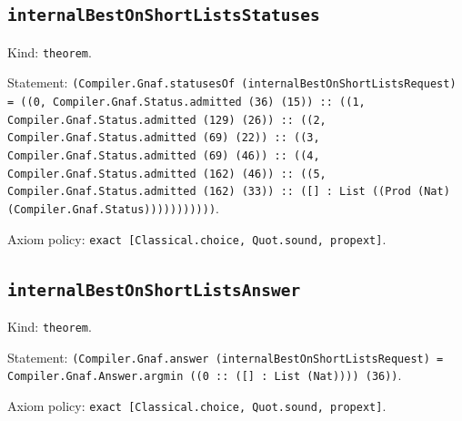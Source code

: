 \documentclass[11pt]{article}
\begin{document}
\subsection*{\texttt{internalBestOnShortListsStatuses}}
\noindent Kind: \texttt{theorem}.\par
\noindent Statement: \texttt{(Compiler.Gnaf.statusesOf (internalBestOnShortListsRequest) = ((0, Compiler.Gnaf.Status.admitted (36) (15)) :: ((1, Compiler.Gnaf.Status.admitted (129) (26)) :: ((2, Compiler.Gnaf.Status.admitted (69) (22)) :: ((3, Compiler.Gnaf.Status.admitted (69) (46)) :: ((4, Compiler.Gnaf.Status.admitted (162) (46)) :: ((5, Compiler.Gnaf.Status.admitted (162) (33)) :: ([] : List ((Prod (Nat) (Compiler.Gnaf.Status)))))))))))}.\par
\noindent Axiom policy: \texttt{exact [Classical.choice, Quot.sound, propext]}.\par
\subsection*{\texttt{internalBestOnShortListsAnswer}}
\noindent Kind: \texttt{theorem}.\par
\noindent Statement: \texttt{(Compiler.Gnaf.answer (internalBestOnShortListsRequest) = Compiler.Gnaf.Answer.argmin ((0 :: ([] : List (Nat)))) (36))}.\par
\noindent Axiom policy: \texttt{exact [Classical.choice, Quot.sound, propext]}.\par
\end{document}
